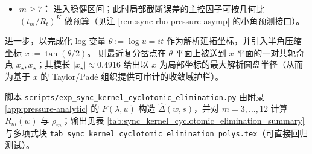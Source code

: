 \begin{remark}[真实解析半径：最近复分岔点钉死 \texorpdfstring{$t=0$}{t=0} 的收敛盘]
\begin{itemize}
  \item \textbf{\(m\ge 7\)：} 进入稳健区间；此时局部截断误差的主控因子可按几何比 \((t_m/R_t)^K\) 做预算（见注 \ref{rem:sync-rho-pressure-asymp} 的小角预测接口）。
 \end{itemize}

\par
进一步，以完成化 log 变量 \(\theta:=\log u=it\) 作为解析延拓坐标，并引入半角压缩坐标
\(
x:=\tan(\theta/2)
\)。
则最近复分岔点在 \(\theta\)-平面上被送到 \(x\)-平面的一对共轭奇点 \(x_\star,\overline{x_\star}\)；其模长 \(|x_\star|\approx 0.4916\) 给出以 \(x\) 为局部坐标的最大解析圆盘半径（从而为基于 \(x\) 的 Taylor/Pad\'e 组织提供可审计的收敛域护栏）。

\end{remark}

\begin{remark}[可复现输出：\texorpdfstring{$m=3,\dots,12$}{m=3..12} 的 \texorpdfstring{$R_m$}{Rm} 与 \texorpdfstring{$\rho_m$}{rhom}]\label{rem:sync-cyclotomic-elimination-table}
脚本 \texttt{scripts/exp\_sync\_kernel\_cyclotomic\_elimination.py} 由附录 \ref{app:pressure-analytic} 的 $F(\lambda,u)$ 构造 $\widehat{\Delta}(w,s)$，并对 $m=3,\dots,12$ 计算 $R_m(w)$ 与 $\rho_m$；输出见表 \ref{tab:sync_kernel_cyclotomic_elimination_summary} 与多项式块 \texttt{tab\_sync\_kernel\_cyclotomic\_elimination\_polys.tex}（可直接回归测试）。
\end{remark}




